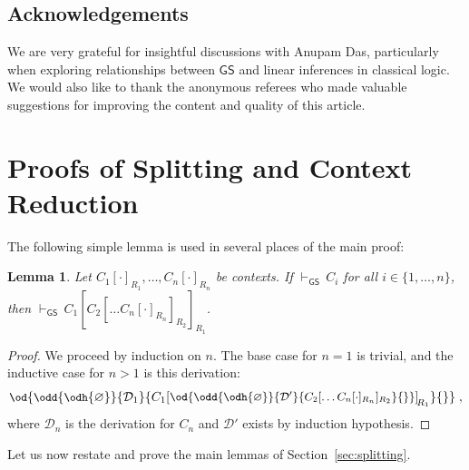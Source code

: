 \documentclass{lmcs} %
\newcommand{\proves}[2][]{\mathord{\vdash_{#1}\,}{#2}}
\renewcommand{\emptyset}{\varnothing}
\def\unit{\emptyset}
\def\GS{\mathsf{GS}}
\newcommand{\coons}[2]{[#1]_{#2}}														%
\newcommand{\Coons}[2]{\!\begin{bmatrix}#1\end{bmatrix}_{\!#2}}  						%
\newcommand{\coonso}[1]{[\cdot]_{#1}}
\def\ods#1#2#3#4{\od{\odd{\odh{#1}}{#2}{#3}{#4}}}
\def\set#1{\{#1\}}
\def\gC{C}
\newcommand{\dD}{\mathcal{D}}
\theoremstyle{plain}
\newtheorem{lemma}[thm]{Lemma}
\begin{document}
\subsection*{Acknowledgements}
We are very grateful for insightful discussions with Anupam Das, particularly when exploring relationships between $\GS$ and linear inferences in 
classical logic. We would also like to thank the anonymous referees who made valuable suggestions for improving the content and quality of this article.







\renewcommand{\addcontentsline}[3]{}









\appendix



\section{Proofs of Splitting and Context Reduction}\label{sec:splittingproofs}

The following simple lemma is used in several places of the main proof:

\begin{lemma}\label{lem:context}
	Let $C_1\coonso{R_1},\ldots,C_n\coonso{R_n}$ be contexts. If
	$\proves[\GS]{C_i}$ for all $i\in\set{1,\ldots,n}$, then
	$\proves[\GS]{C_1\coons{ C_{2}\coons{\ldots C_n\coonso{R_n}}{R_{2}}}{R_1}}$.
\end{lemma}

\begin{proof}
	We proceed by induction on $n$. The base case for $n=1$ is trivial, and the inductive case for $n>1$ is this derivation:
	\begin{equation*}
		\small
		\ods{\unit}{\dD_1}{\gC_1\Coons{\ods{\unit}{\dD'}{C_{2}\coons{ \ldots C_n\coonso{R_n}}{R_{2}}}{}}{R_1}}{}
		\;,
	\end{equation*}
	where $\dD_n$ is the derivation for $C_n$ and $\dD'$ exists by
	induction hypothesis.
\end{proof}

Let us now restate and prove the main lemmas of Section~\ref{sec:splitting}.
\end{document}
